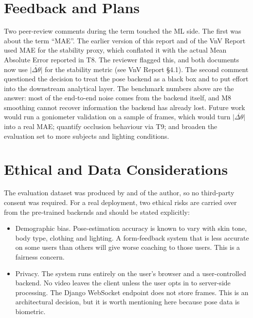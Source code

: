 \documentclass[11pt]{article}
\begin{document}
\section{Feedback and Plans}

Two peer-review comments during the term touched the ML side. The
first was about the term ``MAE''. The earlier version of this report
and of the VnV Report used MAE for the stability proxy, which
conflated it with the actual Mean Absolute Error reported in T8. The
reviewer flagged this, and both documents now use
$\overline{|\Delta\theta|}$ for the stability metric (see VnV Report
\S4.1). The second comment questioned the decision to treat the pose
backend as a black box and to put effort into the downstream
analytical layer. The benchmark numbers above are the answer: most of
the end-to-end noise comes from the backend itself, and M8 smoothing
cannot recover information the backend has already lost. Future work
would run a goniometer validation on a sample of frames, which would
turn $\overline{|\Delta\theta|}$ into a real MAE; quantify occlusion
behaviour via T9; and broaden the evaluation set to more subjects and
lighting conditions.

\section*{Ethical and Data Considerations}

The evaluation dataset was produced by and of the author, so no
third-party consent was required. For a real deployment, two ethical
risks are carried over from the pre-trained backends and should be
stated explicitly:

\begin{itemize}
  \item Demographic bias. Pose-estimation accuracy is known to vary
    with skin tone, body type, clothing and lighting. A form-feedback
    system that is less accurate on some users than others will give
    worse coaching to those users. This is a fairness concern.
  \item Privacy. The system runs entirely on the user's browser and a
    user-controlled backend. No video leaves the client unless the
    user opts in to server-side processing. The Django WebSocket
    endpoint does not store frames. This is an architectural
    decision, but it is worth mentioning here because pose data is
    biometric.
\end{itemize}


\end{document}
